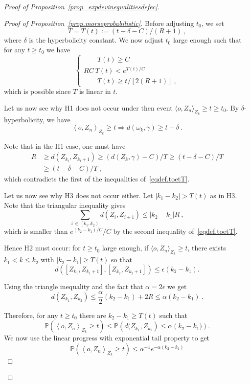 \documentclass[AHL,Unicode,longabstracts,published]{cedram}
\newcommand{\PP}{\mathbb{P}}
\newcommand{\g}{\gamma}
\begin{document}
\begin{proof}[{Proof of Proposition~\ref{prop_expdevinequalitiesdefec}}]
\begin{proof}[{Proof of Proposition~\ref{prop.morseprobabilistic}}]
Before adjusting $t_0$, we set
\[
T = T(t) := (t -\delta -C)/(R+1) \ ,
\]
where $\delta$ is the hyperbolicity constant. We now adjust $t_0$ large enough such that for any $t \ge t_0$ we have
\begin{equation}\label{eqdef.toetT}
\begin{cases}
\qquad T(t) \ge C \\
R C \ T(t) < e^{T(t)/C} \\
\qquad T(t) \ge t / [2(R+1)] \ ,
\end{cases} 
\end{equation}
which is possible since $T$ is linear in $t$. 

Let us now see why H1 does not occur under then event $\langle o, Z_{n}\rangle_{Z_k} \ge t \ge t_0$. By $\delta$-hyperbolicity, we have
\[
\left\langle o, Z_{n}\right\rangle_{Z_k} \geq t \Longrightarrow d(\omega_k, \gamma) \ge t - \delta \ .
\]

Note that in the H1 case, one must have
\begin{align*}
R & \ge d\left(Z_{k_i}, Z_{k_i+1}\right) \ge \left(d(Z_k,\g) -C\right)/T \ge \left(t - \delta -C\right)/T \\
& \ge (t - \delta -C)/T \ ,
\end{align*}
which contradicts the first of the inequalities of~\eqref{eqdef.toetT}. 

Let us now see why H3 does not occur either. Let $|k_1 -k_2| > T(t)$ as in H3. Note that the triangular inequality gives
\[
\sum_{i\,\in\,\left[k_1, k_2\right)} d\left(Z_i, Z_{i+1}\right)\leq \left|k_2-k_1\right|R \ ,
\]
which is smaller than $e^{(k_2-k_1)/C}/C$ by the second inequality of~\eqref{eqdef.toetT}. 

Hence H2 must occur: for $t \ge t_0$ large enough, if $\langle o, Z_{n}\rangle_{Z_k} \geq t$, there exists $k_1< k \leq k_2$ with $|k_2-k_1|\geq T(t)$ so that
\[
d\left(\left[Z_{k_1}, Z_{k_1+1}\right], \left[Z_{k_2}, Z_{k_2+1}\right]\right) \leq \epsilon \left(k_2-k_1\right).
\]


Using the triangle inequality and the fact that $\alpha = 2 \epsilon$ we get
\[
d\left(Z_{k_1}, Z_{k_2}\right) \leq\frac{\alpha}{2}\left(k_2-k_1\right)+ 2R \leq \alpha \left(k_2-k_1\right) \ .
\]

Therefore, for any $t \ge t_0$ there are $k_2 - k_1 \ge T(t)$ such that
\[
\PP\left(\left\langle o, Z_{n}\right\rangle_{Z_k} \geq t\right) \le \PP\left(d(Z_{k_1}, Z_{k_2}\right) \leq \alpha \left(k_2-k_1)\right).
\]
We now use the linear progress with exponential tail property to get
\[
\PP\left(\left\langle o, Z_{n}\right\rangle_{Z_k} \geq t\right) \le \alpha^{-1} e^{- \alpha \left(k_2 -k_1\right)}
\]


\end{proof}
\end{proof}
\end{document}
